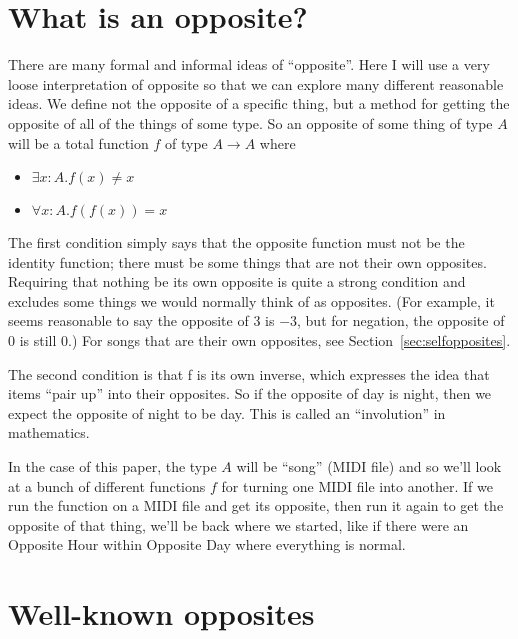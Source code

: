 \documentclass[twocolumn]{article}
\begin{document}

\section{What is an opposite?}

There are many formal and informal ideas of ``opposite''. Here I will
use a very loose interpretation of opposite so that we can explore
many different reasonable ideas. We define not the opposite of a
specific thing, but a method for getting the opposite of all of the
things of some type. So an opposite of some thing of type $A$ will be a
total function $f$ of type $A \rightarrow A$ where
%
\begin{itemize}
\item $\exists x{:}A. f(x) \neq x$
\item $\forall x{:}A. f(f(x)) = x$
\end{itemize}

The first condition simply says that the opposite function must not be
the identity function; there must be some things that are not their
own opposites. Requiring that nothing be its own opposite is quite a
strong condition and excludes some things we would normally think of
as opposites. (For example, it seems reasonable to say the opposite of
$3$ is $-3$, but for negation, the opposite of $0$ is still $0$.) For
songs that are their own opposites, see
Section~\ref{sec:selfopposites}.

The second condition is that f is its own inverse, which expresses
the idea that items ``pair up'' into their opposites. So if the opposite
of day is night, then we expect the opposite of night to be day. This
is called an ``involution'' in mathematics.

In the case of this paper, the type $A$ will be ``song'' (MIDI file)
and so we'll look at a bunch of different functions $f$ for turning
one MIDI file into another. If we run the function on a MIDI file and
get its opposite, then run it again to get the opposite of that thing,
we'll be back where we started, like if there were an Opposite Hour
within Opposite Day where everything is normal.

\section{Well-known opposites}
\end{document}
